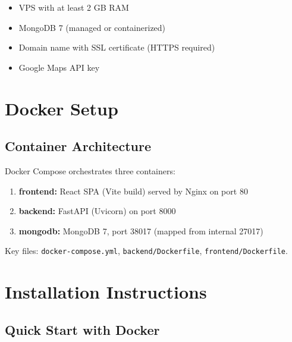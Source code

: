 \documentclass[11pt,a4paper]{report}
\begin{document}
\begin{itemize}
    \item VPS with at least 2 GB RAM
    \item MongoDB 7 (managed or containerized)
    \item Domain name with SSL certificate (HTTPS required)
    \item Google Maps API key
\end{itemize}

\section{Docker Setup}

\subsection{Container Architecture}

Docker Compose orchestrates three containers:

\begin{enumerate}
    \item \textbf{frontend:} React SPA (Vite build) served by Nginx on port 80
    \item \textbf{backend:} FastAPI (Uvicorn) on port 8000
    \item \textbf{mongodb:} MongoDB 7, port 38017 (mapped from internal 27017)
\end{enumerate}

Key files: \texttt{docker-compose.yml}, \texttt{backend/Dockerfile}, \texttt{frontend/Dockerfile}.

\section{Installation Instructions}

\subsection{Quick Start with Docker}
\end{document}
